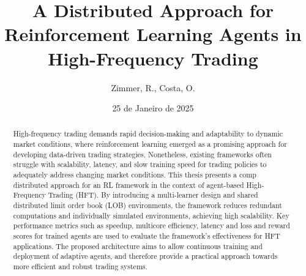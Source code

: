 \title{A Distributed Approach for Reinforcement Learning Agents in High-Frequency Trading}
\author{Zimmer, R., Costa, O.}
\date{25 de Janeiro de 2025}

\maketitle
\begin{abstract}
    High-frequency trading demands rapid decision-making and adaptability to dynamic market conditions, where
    reinforcement learning emerged as a promising approach for developing data-driven trading strategies.
    Nonetheless, existing frameworks often struggle with scalability, latency,
    and slow training speed for trading policies to adequately address changing market conditions.
    This thesis presents a comp distributed approach for an RL framework in the context of agent-based High-Frequency Trading (HFT).
    By introducing a multi-learner design and shared distributed limit order book (LOB) environments,
    the framework reduces redundant computations and individually simulated environments, achieving high scalability.
    Key performance metrics such as speedup, multicore efficiency, latency
    and loss and reward scores for trained agents are used to evaluate the framework's effectiveness for HFT applications.
    The proposed architecture aims to allow continuous training and deployment of adaptive agents,
    and therefore provide a practical approach towards more efficient and robust trading systems.
\end{abstract}


